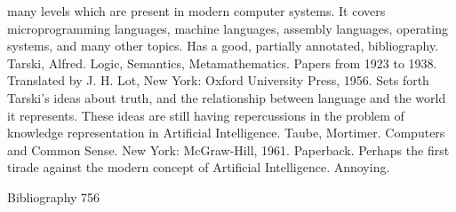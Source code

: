   many levels which are present in modern computer systems. It covers
  microprogramming languages, machine languages, assembly languages, operating
  systems, and many other topics. Has a good, partially annotated, bibliography.
Tarski, Alfred. Logic, Semantics, Metamathematics. Papers from 1923 to 1938.
  Translated by J. H. Lot, New York: Oxford University Press, 1956. Sets forth Tarski's
  ideas about truth, and the relationship between language and the world it represents.
  These ideas are still having repercussions in the problem of knowledge representation
  in Artificial Intelligence.
Taube, Mortimer. Computers and Common Sense. New York: McGraw-Hill, 1961.
  Paperback. Perhaps the first tirade against the modern concept of Artificial Intelligence.
  Annoying.



Bibliography                                                                            756

